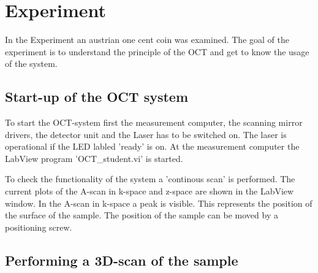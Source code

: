\chapter{Experiment}

In the Experiment an austrian one cent coin was examined. The goal of the experiment is to understand the principle of the OCT and get to know the usage of the system.

\section{Start-up of the OCT system}

To start the OCT-system first the measurement computer, the scanning mirror drivers, the detector unit and the Laser has to be switched on. The laser is operational if the LED labled 'ready' is on. At the measurement computer the LabView program 'OCT\_student.vi' is started.

To check the functionality of the system a 'continous scan' is performed. The current plots of the A-scan in k-space and z-space are shown in the LabView window. In the A-scan in k-space a peak is visible. This represents the position of the surface of the sample. The position of the sample can be moved by a positioning screw. 


\section{Performing a 3D-scan of the sample}